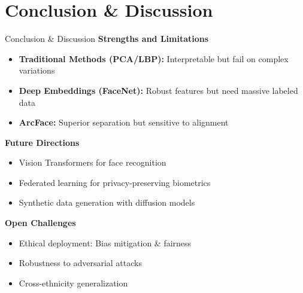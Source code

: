 \documentclass[pdfpagelabels=false, usepdftitle=false, aspectratio=169]{beamer}
\begin{document}
\section{Conclusion \& Discussion}
\begin{frame}{Conclusion \& Discussion}
    \textbf{Strengths and Limitations}
    \begin{itemize}
        \item \textbf{Traditional Methods (PCA/LBP):} Interpretable but fail on complex variations
        \item \textbf{Deep Embeddings (FaceNet):} Robust features but need massive labeled data
        \item \textbf{ArcFace:} Superior separation but sensitive to alignment
    \end{itemize}

    \textbf{Future Directions}
    \begin{itemize}
        \item Vision Transformers for face recognition
        \item Federated learning for privacy-preserving biometrics
        \item Synthetic data generation with diffusion models
    \end{itemize}

    \textbf{Open Challenges}
    \begin{itemize}
        \item Ethical deployment: Bias mitigation \& fairness
        \item Robustness to adversarial attacks
        \item Cross-ethnicity generalization
    \end{itemize}

\end{frame}
\end{document}
